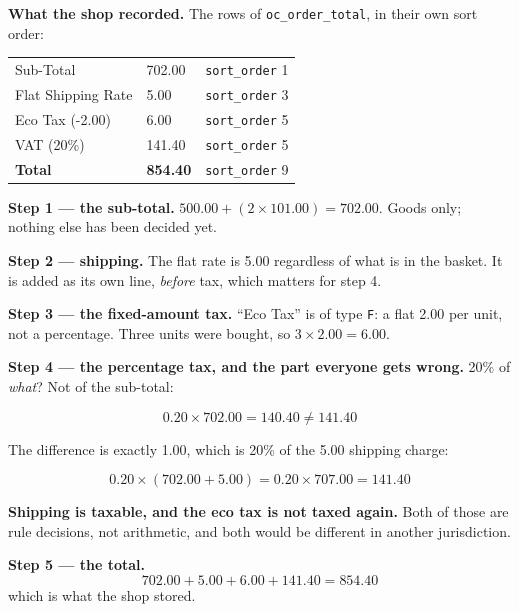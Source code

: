 \begin{worked}
\textbf{What the shop recorded.} The rows of \texttt{oc\_order\_total}, in
their own sort order:

\smallskip
\begin{tabular}{@{}L{5.0cm}L{3.2cm}L{4.4cm}@{}}
Sub-Total & 702.00 & \texttt{sort\_order} 1 \\
Flat Shipping Rate & 5.00 & \texttt{sort\_order} 3 \\
Eco Tax (-2.00) & 6.00 & \texttt{sort\_order} 5 \\
VAT (20\%) & 141.40 & \texttt{sort\_order} 5 \\
\textbf{Total} & \textbf{854.40} & \texttt{sort\_order} 9 \\
\end{tabular}

\smallskip
\textbf{Step 1 --- the sub-total.} $500.00 + (2 \times 101.00) = 702.00$. Goods
only; nothing else has been decided yet.

\smallskip
\textbf{Step 2 --- shipping.} The flat rate is 5.00 regardless of what is in
the basket. It is added as its own line, \emph{before} tax, which matters for
step 4.

\smallskip
\textbf{Step 3 --- the fixed-amount tax.} ``Eco Tax'' is of type \texttt{F}:
a flat 2.00 per unit, not a percentage. Three units were bought, so
$3 \times 2.00 = 6.00$.

\smallskip
\textbf{Step 4 --- the percentage tax, and the part everyone gets wrong.}
20\% of \emph{what}? Not of the sub-total:

\[ 0.20 \times 702.00 = 140.40 \neq 141.40 \]

The difference is exactly 1.00, which is 20\% of the 5.00 shipping charge:

\[ 0.20 \times (702.00 + 5.00) = 0.20 \times 707.00 = \mathbf{141.40} \]

\textbf{Shipping is taxable, and the eco tax is not taxed again.} Both of those
are rule decisions, not arithmetic, and both would be different in another
jurisdiction.

\smallskip
\textbf{Step 5 --- the total.}
\[ 702.00 + 5.00 + 6.00 + 141.40 = \mathbf{854.40} \]
which is what the shop stored.
\end{worked}

